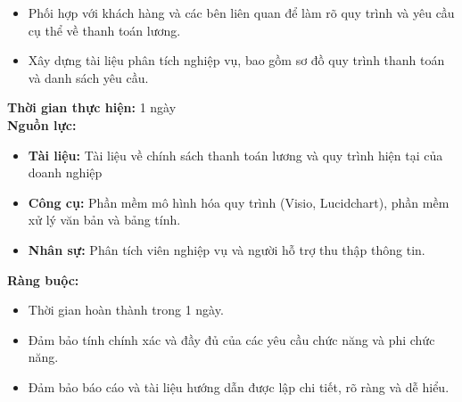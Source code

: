 {\begin{minipage}{\textwidth}
\begin{itemize}
        \item Phối hợp với khách hàng và các bên liên quan để làm rõ quy trình và yêu cầu cụ thể về thanh toán lương.
        \item Xây dựng tài liệu phân tích nghiệp vụ, bao gồm sơ đồ quy trình thanh toán và danh sách yêu cầu.
    \end{itemize}
    \vspace{0.5cm}
    \noindent \textbf{Thời gian thực hiện:} 1 ngày \\
    \noindent \textbf{Nguồn lực:}
    \begin{itemize}
        \item \textbf{Tài liệu:} Tài liệu về chính sách thanh toán lương và quy trình hiện tại của doanh nghiệp
        \item \textbf{Công cụ:} Phần mềm mô hình hóa quy trình (Visio, Lucidchart), phần mềm xử lý văn bản và bảng tính.
        \item \textbf{Nhân sự:} Phân tích viên nghiệp vụ và người hỗ trợ thu thập thông tin.
    \end{itemize}
    \vspace{0.5cm}
    \noindent \textbf{Ràng buộc:}
    \begin{itemize}
        \item Thời gian hoàn thành trong 1 ngày.
        \item Đảm bảo tính chính xác và đầy đủ của các yêu cầu chức năng và phi chức năng.
        \item Đảm bảo báo cáo và tài liệu hướng dẫn được lập chi tiết, rõ ràng và dễ hiểu.
    \end{itemize}
    \end{minipage}
}

\newpage %

% 
